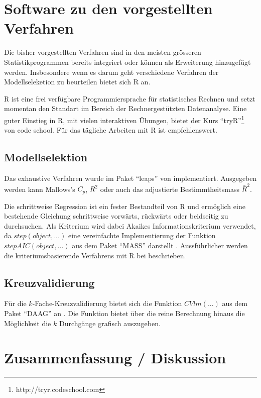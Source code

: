 \documentclass[english,12pt,doc]{apa}
\begin{document}
\section{Software zu den vorgestellten Verfahren}
Die bisher vorgestellten Verfahren sind in den meisten grösseren Statistikprogrammen bereits integriert oder können als Erweiterung hinzugefügt werden.
Insbesondere wenn es darum geht verschiedene Verfahren der Modellseleketion zu beurteilen bietet sich R an.

R ist eine frei verfügbare Programmiersprache für statistisches Rechnen und setzt momentan den Standart im Bereich der Rechnergestützten Datenanalyse. 
Eine guter Einstieg in R, mit vielen interaktiven Übungen, bietet der Kurs ``tryR''\footnote{http://tryr.codeschool.com} von code school.
Für das tägliche Arbeiten mit R ist   empfehlenswert.

\subsection{Modellselektion}
Das exhaustive Verfahren wurde im Paket ``leaps'' von  implementiert. 
Ausgegeben werden kann Mallows's $C_p$, $R^2$ oder auch das adjustierte Bestimmtheitsmass $\bar R^2$.

Die schrittweise Regression ist ein fester Bestandteil von R \cite{R:core} und ermöglich eine bestehende Gleichung schrittweise vorwärts, rückwärts oder beidseitig zu durchsuchen.
Als Kriterium wird dabei Akaikes Informationskriterium verwendet, da $step(object, ...)$ eine vereinfachte Implementierung der Funktion $stepAIC(object, ...)$  aus dem Paket ``MASS'' darstellt \cite{R:MASS}. 
Aussführlicher werden die kriteriumsbasierende Verfahrens mit R bei  beschrieben.

\subsection{Kreuzvalidierung}
Für die $k$-Fache-Kreuzvalidierung bietet sich die Funktion $CVlm(...)$ aus dem Paket ``DAAG'' an \cite{R:DAAG}. 
Die Funktion bietet über die reine Berechnung hinaus die Möglichkeit die $k$ Durchgänge grafisch auszugeben.


\section{Zusammenfassung / Diskussion} 


\blindtext
\end{document}
